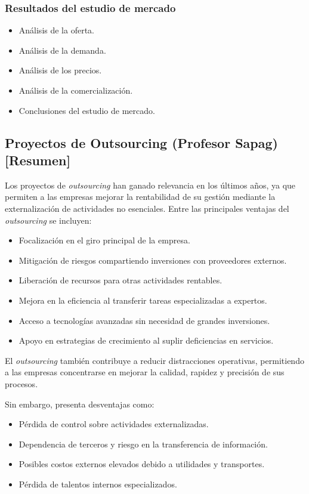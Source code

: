 \documentclass{templateNote}
\begin{document}
\subsubsection*{Resultados del estudio de mercado}
\begin{itemize}
    \item Análisis de la oferta.
    \item Análisis de la demanda.
    \item Análisis de los precios.
    \item Análisis de la comercialización.
    \item Conclusiones del estudio de mercado.
\end{itemize}

\subsection*{Proyectos de Outsourcing (Profesor Sapag) [Resumen]}

Los proyectos de \textit{outsourcing} han ganado relevancia en los últimos años, ya que permiten a las empresas mejorar la rentabilidad de su gestión mediante la externalización de actividades no esenciales. Entre las principales ventajas del \textit{outsourcing} se incluyen:
\begin{itemize}
    \item Focalización en el giro principal de la empresa.
    \item Mitigación de riesgos compartiendo inversiones con proveedores externos.
    \item Liberación de recursos para otras actividades rentables.
    \item Mejora en la eficiencia al transferir tareas especializadas a expertos.
    \item Acceso a tecnologías avanzadas sin necesidad de grandes inversiones.
    \item Apoyo en estrategias de crecimiento al suplir deficiencias en servicios.
\end{itemize}

El \textit{outsourcing} también contribuye a reducir distracciones operativas, permitiendo a las empresas concentrarse en mejorar la calidad, rapidez y precisión de sus procesos.

Sin embargo, presenta desventajas como:
\begin{itemize}
    \item Pérdida de control sobre actividades externalizadas.
    \item Dependencia de terceros y riesgo en la transferencia de información.
    \item Posibles costos externos elevados debido a utilidades y transportes.
    \item Pérdida de talentos internos especializados.
\end{itemize}
\end{document}
